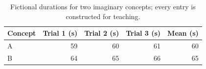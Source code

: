 \begin{table}[htbp]
\centering
\begin{tabular}{lrrrr}
\toprule
Concept & Trial 1 (s) & Trial 2 (s) & Trial 3 (s) & Mean (s)\\
\midrule
A & 59 & 60 & 61 & 60\\
B & 64 & 65 & 66 & 65\\
\bottomrule
\end{tabular}
\caption{Fictional durations for two imaginary concepts; every entry is constructed for teaching.}
\label{tab:results}
\end{table}
